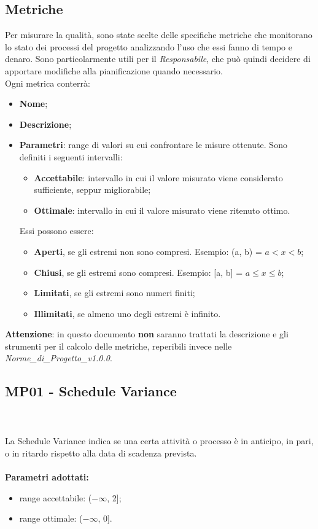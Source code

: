 \subsection{Metriche}
Per misurare la qualità, sono state scelte delle specifiche metriche che monitorano lo stato dei processi del progetto analizzando l'uso che essi fanno di tempo e denaro. Sono particolarmente utili per il \textit{Responsabile}, che può quindi decidere di apportare modifiche alla pianificazione quando necessario.\\
Ogni metrica conterrà:
\begin{itemize}
\item \textbf{Nome};
\item \textbf{Descrizione};
\item \textbf{Parametri}: range di valori su cui confrontare le misure ottenute. Sono definiti i seguenti intervalli: \begin{itemize}
\item \textbf{Accettabile}: intervallo in cui il valore misurato viene considerato sufficiente, seppur migliorabile;
\item \textbf{Ottimale}: intervallo in cui il valore misurato viene ritenuto ottimo.
\end{itemize}
Essi possono essere: \begin{itemize}
\item \textbf{Aperti}, se gli estremi non sono compresi. Esempio: (a, b) = $a < x < b$; 
\item \textbf{Chiusi}, se gli estremi sono compresi. Esempio: [a, b] = $a \leq x \leq b$;
\item \textbf{Limitati}, se gli estremi sono numeri finiti;
\item \textbf{Illimitati}, se almeno uno degli estremi è infinito.
\end{itemize}
\end{itemize}
\textbf{Attenzione}: in questo documento \textbf{non} saranno trattati la descrizione e gli strumenti per il calcolo delle metriche, reperibili invece nelle \textit{Norme\_di\_Progetto\_v1.0.0}.

\subsection{MP01 - Schedule Variance} \mbox{} \\ \mbox{} \\
La Schedule Variance indica se una certa attività o processo è in anticipo, in pari, o in ritardo rispetto alla data di scadenza prevista. \\ \\ 
\textbf{Parametri adottati:} 
\begin{itemize}
\item range accettabile: ($ -\infty $, 2];
\item range ottimale: ($ -\infty $, 0].
\end{itemize}

